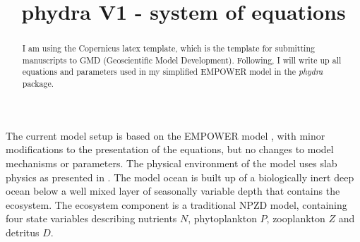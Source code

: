 \documentclass[journal abbreviation, manuscript]{copernicus}
\begin{document}
\title{phydra V1 - system of equations}















\received{}
\pubdiscuss{} %
\revised{}
\accepted{}
\published{}



\maketitle



\begin{abstract}
I am using the Copernicus latex template, which is the template for submitting manuscripts to GMD (Geoscientific Model Development). Following, I will write up all equations and parameters used in my simplified EMPOWER model in the \textit{phydra} package.
\end{abstract}




\introduction  %
The current model setup is based on the EMPOWER model \citep{Anderson2015c}, with minor modifications to the presentation of the equations, but no changes to model mechanisms or parameters.
The physical environment of the model uses slab physics as presented in \citet{Evans1985ACycles}. The model ocean is built up of a biologically inert deep ocean below a well mixed layer of seasonally variable depth that contains the ecosystem. The ecosystem component is a traditional NPZD model, containing four state variables describing nutrients $N$, phytoplankton $P$, zooplankton $Z$ and detritus $D$.
%
%
%
%
%
%
\end{document}
